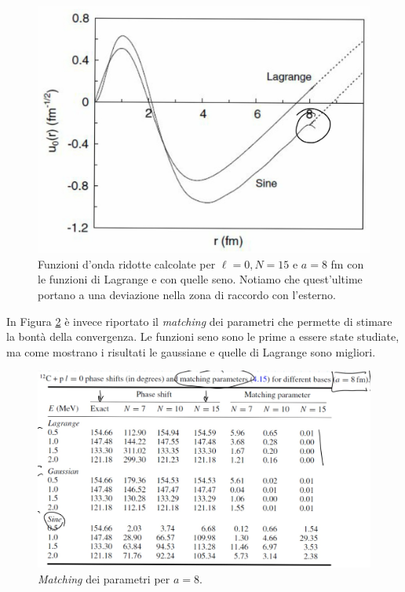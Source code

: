 \begin{figure}[!h]
	\centering
	\includegraphics[scale=0.2]{Immagini/0414_metodi2.png}
	\caption{Funzioni d'onda ridotte calcolate per $\ell=0,N=15$ e $a=8$ fm con le funzioni di Lagrange e con quelle seno. Notiamo che quest'ultime portano a una deviazione nella zona di raccordo con l'esterno.}
	\label{0414_p12C-2}
\end{figure}
\noindent In Figura \ref{0414_p12C-3} è invece riportato il \textit{matching} dei parametri che permette di stimare la bontà della convergenza. Le funzioni seno sono le prime a essere state studiate, ma come mostrano i risultati le gaussiane e quelle di Lagrange sono migliori.
\begin{figure}[!th]
	\centering
	\includegraphics[scale=0.2]{Immagini/0414_metodi3.png}
	\caption{\textit{Matching} dei parametri per $a=8$.}
	\label{0414_p12C-3}
\end{figure}

